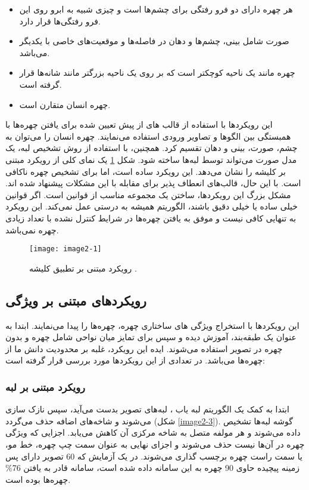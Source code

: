 \begin{itemize}
\setlength\itemsep{0.5em}
\item
هر چهره دارای دو فرو رفتگی برای چشم‌ها است و چیزی شبیه به ابرو روی این فرو رفتگی‌ها قرار دارد.
\item
صورت شامل بینی، چشم‌ها و دهان در فاصله‌ها و موقعیت‌های خاصی با یکدیگر می‌باشد.
\item
چهره مانند یک ناحیه کوچکتر است که بر روی یک ناحیه بزرگتر مانند شانه‌ها قرار گرفته است. 
\item
چهره انسان متقارن است.
\end{itemize} 

\noindent
این رویکردها با استفاده از قالب  ‌های از پیش تعیین شده برای یافتن چهره‌ها با همبستگی بین الگوها و تصاویر ورودی استفاده می‌نمایند. چهره انسان را می‌توان به چشم، صورت، بینی و دهان تقسیم کرد. همچنین، با استفاده از روش تشخیص لبه، یک مدل صورت می‌تواند توسط لبه‌ها ساخته شود. شکل \ref{image2-1} یک نمای کلی از رویکرد مبتنی بر کلیشه را نشان می‌دهد. این رویکرد ساده است، اما برای تشخیص چهره ناکافی است. با این حال، قالب‌های انعطاف پذیر برای مقابله با این مشکلات پیشنهاد شده اند. مشکل بزرگ این رویکرد‌ها، ساختن یک مجموعه مناسب از قوانین است. اگر قوانین خیلی ساده یا خیلی دقیق باشند، الگوریتم همیشه به درستی عمل نمی‌کند. این رویکرد به تنهایی کافی نیست و موفق به یافتن چهره‌ها در شرایط کنترل نشده با تعداد زیادی چهره نمی‌باشد.

\begin{figure}[h]
\centering
  \texttt{[image: image2-1]}
  \caption{رویکرد مبتنی بر تطبیق کلیشه  \cite{ref1}.}
  \label{image2-1}
\end{figure}

\subsection{رویکردهای مبتنی بر ویژگی}
این رویکردها‌ با استخراج ویژگی  ‌های ساختاری چهره، چهره‌ها را پیدا می‌نمایند. ابتدا به عنوان یک طبقه‌بند، آموزش دیده و سپس برای تمایز میان نواحی شامل چهره و بدون چهره در تصویر استفاده می‌شوند. ایده این رویکرد، غلبه بر محدودیت دانش ما از چهره‌ها می‌باشد. در \cite{HJELMAS2001236} تعدادی از این رویکردها مورد بررسی قرار گرفته است:

\subsubsection{رویکرد مبتنی بر لبه}
ابتدا به کمک یک الگوریتم لبه یاب ، لبه‌های تصویر بدست می‌آید، سپس نازک سازی می‌شوند و شاخه‌های اضافه حذف می‌گردد (شکل \ref{image2-3}). گوشه لبه‌ها تشخیص داده می‌شوند و هر مولفه متصل  به شاخه مرکزی آن کاهش می‌یابد. اجزایی که ویژگی چهره در آن‌ها نیست حذف می‌شوند و اجزای نهایی به عنوان سمت چپ چهره، خط مو، یا سمت راست چهره برچسب گذاری می‌شوند. در یک آزمایش که 60 تصویر دارای پس زمینه پیچیده حاوی 90 چهره به این سامانه داده شده است، سامانه قادر به یافتن 76\% چهره‌ها بوده است.

